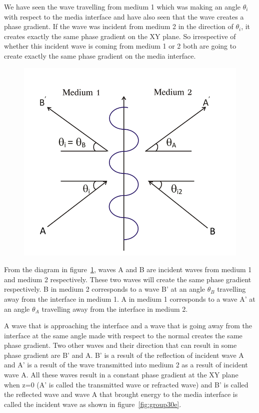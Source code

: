We have seen the wave travelling from medium 1  which was making an angle $\theta_i$ with respect to the media interface and have also seen that the wave creates a phase gradient. If the wave was incident from medium 2 in the direction of $\theta_i$, it creates exactly the same phase gradient on the XY plane. So irrespective of whether this incident wave is coming from medium 1 or 2 both are going to create exactly the same phase gradient on the media interface.
\begin{figure}[h]
\centering
\includegraphics[width=.7\linewidth]{graphics/incident_and_reflected_waves}
\caption{}
\label{fig:group30d---copy}
\end{figure}

From the diagram in figure~\ref{fig:group30d---copy}, waves A and B are incident waves from medium 1 and medium 2 respectively. These two waves will create the same phase gradient respectively. B in medium 2 corresponds to a wave B'  at an angle $\theta_B$ travelling away from the interface in medium 1. A in medium 1 corresponds to a wave A' at an angle $\theta_A$ travelling away from the interface in medium 2.

A wave that is approaching the interface and a wave that is going away from the interface at the same angle made with respect to the normal creates the same phase gradient. Two other waves and their direction that can result in some phase gradient are B'
and A. B' is a result of the reflection of incident wave A and A' is a result of the wave transmitted into medium 2 as a result of incident wave A. All these waves result in a constant phase gradient at the XY plane when z=0 (A' is called the transmitted wave or refracted wave) and B' is called the reflected wave and wave A that brought energy to the media interface is called the incident wave as shown in figure~\ref{fig:group30e}.


